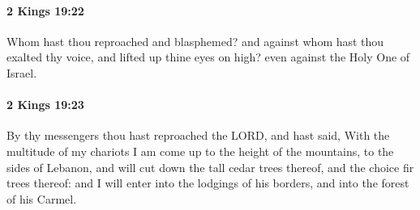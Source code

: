 		\paragraph{2 Kings 19:22} %
			\label{2KINGS-19-22}

			Whom hast thou reproached and blasphemed? and against whom hast thou exalted thy voice, and lifted up thine eyes on high? even against the Holy One of Israel.


		\paragraph{2 Kings 19:23} %
			\label{2KINGS-19-23}

			By thy messengers thou hast reproached the LORD, and hast said, With the multitude of my chariots I am come up to the height of the mountains, to the sides of Lebanon, and will cut down the tall cedar trees thereof, and the choice fir trees thereof: and I will enter into the lodgings of his borders, and into the forest of his Carmel.

